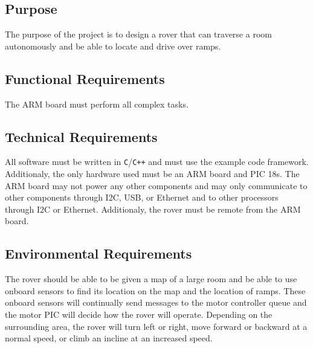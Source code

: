 









\subsection*{Purpose}
The purpose of the project is to design a rover that can traverse a room autonomously and be able to locate and drive over ramps.

\subsection*{Functional Requirements}
The ARM board must perform all complex tasks. 

\subsection*{Technical Requirements}
All software must be written in \texttt{C}/\texttt{C++} and must use the example code framework. Additionaly, the only hardware used must be an ARM board and PIC 18s. The ARM board may not power any other components and may only communicate to other components through I2C, USB, or Ethernet and to other processors through I2C or Ethernet. Additionaly, the rover must be remote from the ARM board.

\subsection*{Environmental Requirements}
The rover should be able to be given a map of a large room and be able to use onboard sensors to find its location on the map and the location of ramps. These onboard sensors will continually send messages to the motor controller queue and the motor PIC will decide how the rover will operate. Depending on the surrounding area, the rover will turn left or right, move forward or backward at a normal speed, or climb an incline at an increased speed.

